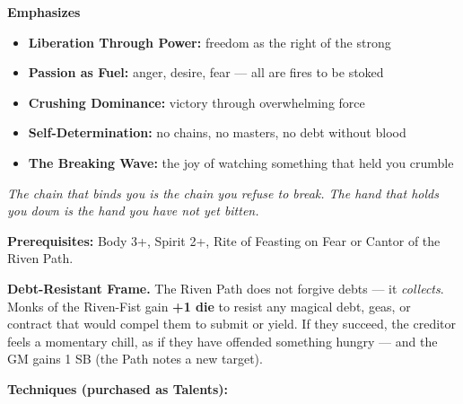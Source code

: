 \noindent\textbf{Emphasizes}
\begin{itemize}
  \item \textbf{Liberation Through Power:} freedom as the right of the strong
  \item \textbf{Passion as Fuel:} anger, desire, fear --- all are fires to be stoked
  \item \textbf{Crushing Dominance:} victory through overwhelming force
  \item \textbf{Self-Determination:} no chains, no masters, no debt without blood
  \item \textbf{The Breaking Wave:} the joy of watching something that held you crumble
\end{itemize}

\begin{tcolorbox}[colback=black!5,colframe=red!80!black,title=\textbf{Riven-Fist (The Riven Path)},breakable]
  \emph{The chain that binds you is the chain you refuse to break. The hand that holds you down is the hand you have not yet bitten.}

  \vspace{2mm}
  \noindent\textbf{Prerequisites:} Body 3+, Spirit 2+, Rite of Feasting on Fear or Cantor of the Riven Path.

  \vspace{2mm}
  \noindent\textbf{Debt-Resistant Frame.} The Riven Path does not forgive debts --- it \textit{collects}. Monks of the Riven-Fist gain \textbf{+1 die} to resist any magical debt, geas, or contract that would compel them to submit or yield. If they succeed, the creditor feels a momentary chill, as if they have offended something hungry --- and the GM gains 1 SB (the Path notes a new target).

  \vspace{2mm}
  \noindent\textbf{Techniques (purchased as Talents):}


\end{tcolorbox}
